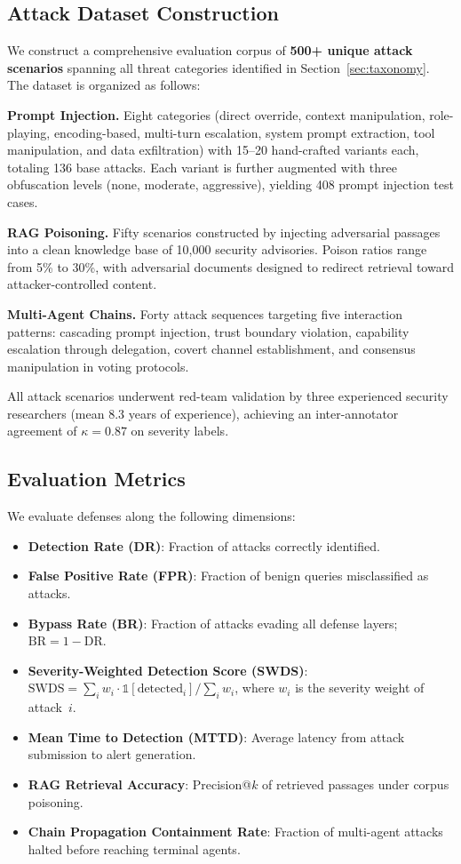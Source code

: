 \subsection{Attack Dataset Construction}

We construct a comprehensive evaluation corpus of \textbf{500+ unique attack scenarios} spanning all threat categories identified in Section~\ref{sec:taxonomy}. The dataset is organized as follows:

\textbf{Prompt Injection.} Eight categories (direct override, context manipulation, role-playing, encoding-based, multi-turn escalation, system prompt extraction, tool manipulation, and data exfiltration) with 15--20 hand-crafted variants each, totaling 136 base attacks. Each variant is further augmented with three obfuscation levels (none, moderate, aggressive), yielding 408 prompt injection test cases.

\textbf{RAG Poisoning.} Fifty scenarios constructed by injecting adversarial passages into a clean knowledge base of 10{,}000 security advisories. Poison ratios range from 5\% to 30\%, with adversarial documents designed to redirect retrieval toward attacker-controlled content.

\textbf{Multi-Agent Chains.} Forty attack sequences targeting five interaction patterns: cascading prompt injection, trust boundary violation, capability escalation through delegation, covert channel establishment, and consensus manipulation in voting protocols.

All attack scenarios underwent red-team validation by three experienced security researchers (mean 8.3 years of experience), achieving an inter-annotator agreement of $\kappa = 0.87$ on severity labels.

\subsection{Evaluation Metrics}

We evaluate defenses along the following dimensions:
\begin{itemize}
    \item \textbf{Detection Rate (DR)}: Fraction of attacks correctly identified.
    \item \textbf{False Positive Rate (FPR)}: Fraction of benign queries misclassified as attacks.
    \item \textbf{Bypass Rate (BR)}: Fraction of attacks evading all defense layers; $\text{BR} = 1 - \text{DR}$.
    \item \textbf{Severity-Weighted Detection Score (SWDS)}: $\text{SWDS} = \sum_{i} w_i \cdot \mathbb{1}[\text{detected}_i] / \sum_i w_i$, where $w_i$ is the severity weight of attack~$i$.
    \item \textbf{Mean Time to Detection (MTTD)}: Average latency from attack submission to alert generation.
    \item \textbf{RAG Retrieval Accuracy}: Precision@$k$ of retrieved passages under corpus poisoning.
    \item \textbf{Chain Propagation Containment Rate}: Fraction of multi-agent attacks halted before reaching terminal agents.
\end{itemize}

